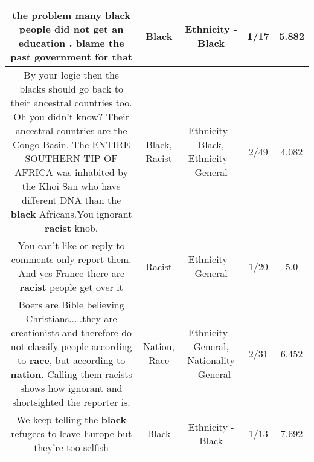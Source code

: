 \documentclass[11pt]{article}
\newlength\mylength
\begin{document}
\begin{center}
\begin{longtable}{|C{.65\mylength}|C{.30\mylength}|C{.12\mylength}|C{.12\mylength}|C{.12\mylength}|}
  \small the problem many \textbf{black} people did not get an education  . blame the past government for that\normalsize   & Black & Ethnicity - Black & 1/17 & 5.882 \\  \hline
  \small By your logic then the blacks should go back to their ancestral countries too. Oh you didn't know? Their ancestral countries are the Congo Basin. The ENTIRE SOUTHERN TIP OF AFRICA was inhabited by the Khoi San who have different DNA than the \textbf{black} Africans.You ignorant \textbf{racist} knob.\normalsize   & Black, Racist & Ethnicity - Black, Ethnicity - General & 2/49 & 4.082 \\  \hline
  \small You can't like or reply to comments only report them.  And yes France there are \textbf{racist} people get over it\normalsize   & Racist & Ethnicity - General & 1/20 & 5.0 \\  \hline
  \small Boers are Bible believing Christians.....they are creationists and therefore do not classify people according to \textbf{race}, but according to \textbf{nation}. Calling them racists shows how ignorant and shortsighted the reporter is.\normalsize   & Nation, Race & Ethnicity - General, Nationality - General & 2/31 & 6.452 \\  \hline
  \small We keep telling the \textbf{black} refugees to leave Europe but they're too selfish\normalsize   & Black & Ethnicity - Black & 1/13 & 7.692 \\  \hline

\end{longtable}
\end{center}
\end{document}
